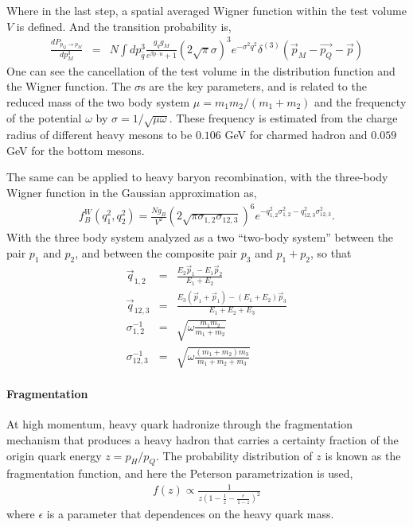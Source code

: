 Where in the last step, a spatial averaged Wigner function within the test volume $V$ is defined.
And the transition probability is,
\begin{eqnarray}
\frac{dP_{p_Q \rightarrow p_M}}{dp_M^3} &=& N\int dp^3_{\bar{q}} \frac{g_q g_M}{e^{\beta p\cdot u} + 1} (2\sqrt{\pi}\sigma)^3 e^{-\sigma^2 q^2} \delta^{(3)}(\vec{p}_M-\vec{p_Q}-\vec{p})
\end{eqnarray}
One can see the cancellation of the test volume in the distribution function and the Wigner function.
The $\sigma$s are the key parameters, and is related to the reduced mass of the two body system $\mu = m_1 m_2/(m_1+m_2)$ and the frequencty of the  potential $\omega$ by $\sigma = 1/\sqrt{\mu \omega}$.
These frequency is estimated from the charge radius of different heavy mesons to be $0.106$ GeV for charmed hadron and $0.059$ GeV for the bottom mesons.

The same can be applied to heavy baryon recombination, with the three-body Wigner function in the Gaussian approximation as,
\begin{eqnarray}
f_B^W(q_1^2, q_2^2) = \frac{N g_B}{V^2} (2\sqrt{\pi\sigma_{1,2}\sigma_{12,3}})^6 e^{-q_{1,2}^2 \sigma_{1,2}^2 - q_{12,3}^2 \sigma_{12,3}^2}.
\end{eqnarray}
With the three body system analyzed as a two ``two-body system'' between the pair $p_1$ and $p_2$, and between the composite pair $p_3$ and $p_1+p_2$, so that
\begin{eqnarray}
\vec{q}_{1,2} &=& \frac{E_2 \vec{p}_1 -E_1\vec{p}_2}{E_1+E_2}\\
\vec{q}_{12,3} &=& \frac{E_3 (\vec{p}_1+\vec{p}_1) - (E_1+E_2)\vec{p}_3}{E_1+E_2 + E_3}\\
\sigma_{1,2}^{-1} &=& \sqrt{\omega \frac{m_1m_2}{m_1+m_2}}\\
\sigma_{12,3}^{-1} &=& \sqrt{\omega \frac{(m_1+m_2)m_3}{m_1+m_2+m_3}}
\end{eqnarray}

\paragraph{Fragmentation} At high momentum, heavy quark hadronize through the fragmentation mechanism that produces a heavy hadron that carries a certainty fraction of the origin quark energy $z = p_H/p_Q$.
The probability distribution of $z$ is known as the fragmentation function, and here the Peterson parametrization is used,
\begin{eqnarray}
f(z) \propto \frac{1}{z(1-\frac{1}{z} - \frac{\epsilon}{1-z})^2}
\end{eqnarray}
where $\epsilon$ is a parameter that dependences on the heavy quark mass.

